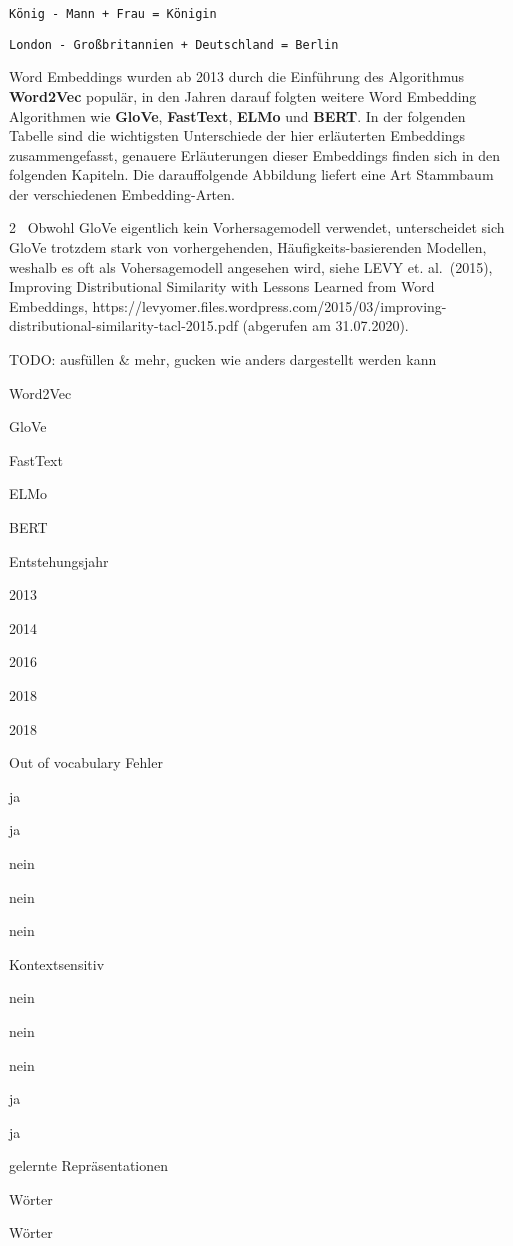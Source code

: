 \documentclass[11pt]{article}
\begin{document}
\texttt{König\ -\ Mann\ +\ Frau\ =\ Königin}

\texttt{London\ -\ Großbritannien\ +\ Deutschland\ =\ Berlin}

Word Embeddings wurden ab 2013 durch die Einführung des Algorithmus
\textbf{Word2Vec} populär, in den Jahren darauf folgten weitere Word
Embedding Algorithmen wie \textbf{GloVe}, \textbf{FastText},
\textbf{ELMo} und \textbf{BERT}. In der folgenden Tabelle sind die
wichtigsten Unterschiede der hier erläuterten Embeddings
zusammengefasst, genauere Erläuterungen dieser Embeddings finden sich in
den folgenden Kapiteln. Die darauffolgende Abbildung liefert eine Art
Stammbaum der verschiedenen Embedding-Arten.

\hypertarget{fn2}{}
2 ~Obwohl GloVe eigentlich kein Vorhersagemodell verwendet,
unterscheidet sich GloVe trotzdem stark von vorhergehenden,
Häufigkeits-basierenden Modellen, weshalb es oft als Vohersagemodell
angesehen wird, siehe LEVY et. al.~(2015), Improving Distributional
Similarity with Lessons Learned from Word Embeddings,
https://levyomer.files.wordpress.com/2015/03/improving-distributional-similarity-tacl-2015.pdf
(abgerufen am 31.07.2020).

    TODO: ausfüllen \& mehr, gucken wie anders dargestellt werden kann

Word2Vec

GloVe

FastText

ELMo

BERT

Entstehungsjahr

2013

2014

2016

2018

2018

Out of vocabulary Fehler

ja

ja

nein

nein

nein

Kontextsensitiv

nein

nein

nein

ja

ja

gelernte Repräsentationen

Wörter

Wörter
\end{document}
